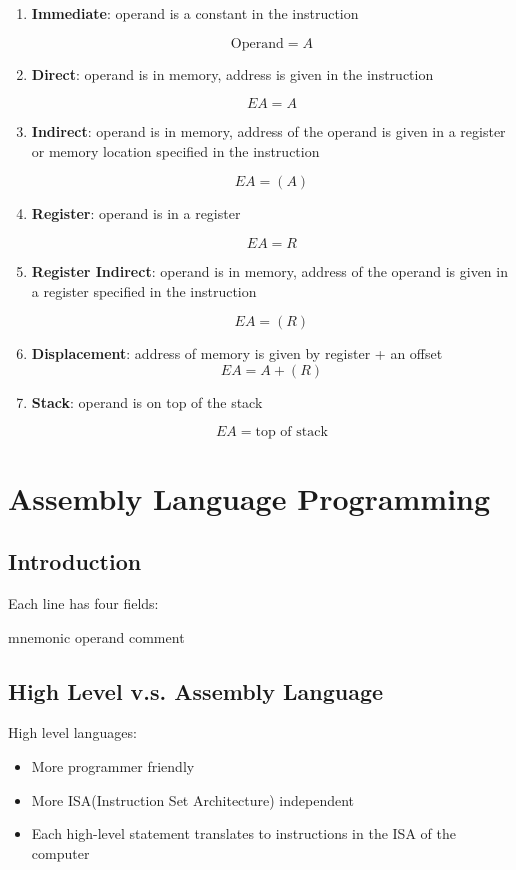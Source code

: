 \documentclass[11pt,a4paper]{article}
\begin{document}
\begin{enumerate}
    \item [1. ] \textbf{Immediate}: operand is a constant in the instruction \par
        \[
        \text{Operand} = A
        \]
    \item [2. ] \textbf{Direct}: operand is in memory, address is given in the instruction \par
        \[
        EA = A
        \]
    \item [3. ] \textbf{Indirect}: operand is in memory, address of the operand is given in a register or memory location specified in the instruction \par    
        \[
        EA = (A)
        \]
    \item [4. ] \textbf{Register}: operand is in a register \par
        \[
        EA = R
        \]
    \item [5. ] \textbf{Register Indirect}: operand is in memory, address of the operand is given in a register specified in the instruction \par
        \[
        EA = (R)
        \]
    \item [6. ] \textbf{Displacement}: address of memory is given by register + an offset
        \[
        EA = A + (R)
        \]
    \item [7. ] \textbf{Stack}: operand is on top of the stack \par
        \[
        EA = \text{top of stack}
        \]
\end{enumerate}

\section{Assembly Language Programming}
\subsection{Introduction}
Each line has four fields: \par
[label]  mnemonic  operand  comment \par

\subsection{High Level v.s. Assembly Language}
High level languages:
\begin{itemize}
    \item More programmer friendly
    \item More ISA(Instruction Set Architecture) independent
    \item Each high-level statement translates to instructions in the ISA of the computer
\end{itemize}
\end{document}
